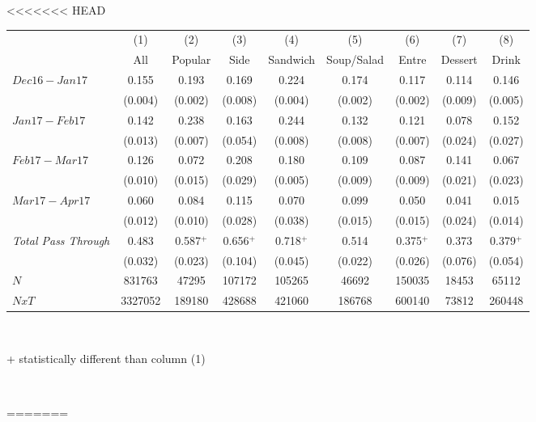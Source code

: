 <<<<<<< HEAD
\begin{center}
\begin{tabular}{lcccccccc}
\hline  & (1) & (2) & (3) & (4) & (5) & (6) & (7) & (8)\\
 & All & Popular & Side & Sandwich & Soup/Salad & Entre & Dessert & Drink\\
\hline  $ Dec16-Jan17 $  & 0.155 & 0.193 & 0.169 & 0.224 & 0.174 & 0.117 & 0.114 & 0.146\\
 & (0.004) & (0.002) & (0.008) & (0.004) & (0.002) & (0.002) & (0.009) & (0.005)\\
 $ Jan17-Feb17 $  & 0.142 & 0.238 & 0.163 & 0.244 & 0.132 & 0.121 & 0.078 & 0.152\\
 & (0.013) & (0.007) & (0.054) & (0.008) & (0.008) & (0.007) & (0.024) & (0.027)\\
 $ Feb17-Mar17 $  & 0.126 & 0.072 & 0.208 & 0.180 & 0.109 & 0.087 & 0.141 & 0.067\\
 & (0.010) & (0.015) & (0.029) & (0.005) & (0.009) & (0.009) & (0.021) & (0.023)\\
 $ Mar17-Apr17 $  & 0.060 & 0.084 & 0.115 & 0.070 & 0.099 & 0.050 & 0.041 & 0.015\\
 & (0.012) & (0.010) & (0.028) & (0.038) & (0.015) & (0.015) & (0.024) & (0.014)\\
\hline \textit{Total Pass Through} & 0.483 & 0.587$^+$ & 0.656$^+$ & 0.718$^+$ & 0.514 & 0.375$^+$ & 0.373 & 0.379$^+$\\
  & (0.032) & (0.023) & (0.104) & (0.045) & (0.022) & (0.026) & (0.076) & (0.054)\\
\hline  $ N $  & 831763 & 47295 & 107172 & 105265 & 46692 & 150035 & 18453 & 65112\\
 $ NxT $  & 3327052 & 189180 & 428688 & 421060 & 186768 & 600140 & 73812 & 260448\\
\hline\end{tabular}\\
\begin{tiny} + statistically different than column (1)\end{tiny}\\
\end{center}
=======
